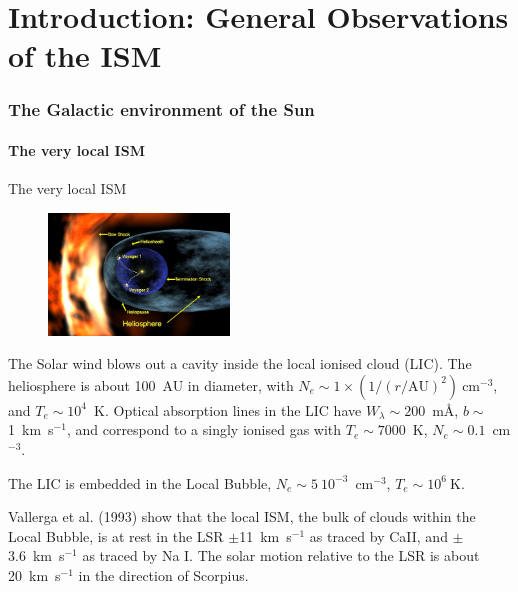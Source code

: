 
\part[I]{Introduction: General Observations of the ISM}
\begin{frame}
  \partpage
  \tableofcontents[part=1]
\end{frame}



\section{The Galactic environment of the Sun}
\subsection{The very local ISM}


\begin{frame}{The very local ISM}

\begin{figure}
    \vspace{-0.5cm}
    \includegraphics[width=0.43\textwidth,height=!]{./A/Voyager_1_entering_heliosheath_region.jpg}
\end{figure}  \vspace{0.1cm} The Solar wind blows out a cavity inside the
local ionised cloud (LIC). The heliosphere is about 100~AU in
diameter, with $N_e \sim 1 \times (1/ (r/\mathrm{AU})^2)~$cm$^{-3}$,
and $T_e \sim 10^4$~K. Optical absorption lines in the LIC have
$W_\lambda \sim 200$~m\AA, $b \sim$1~km~s$^{-1}$, and correspond to a
singly ionised gas with $T_e \sim 7000$~K, $N_e \sim 0.1$~cm$^{-3}$. 

\medskip

The LIC is embedded in the Local Bubble, $N_e \sim 5~10^{-3}$~cm$^{-3}$,
$T_e \sim 10^6~$K.

\medskip

Vallerga et al. (1993) show that the local ISM, the bulk of clouds
within the Local Bubble, is at rest in the LSR $\pm$11~km~s$^{-1}$ as
traced by CaII, and $\pm$3.6~km~s$^{-1}$ as traced by Na I. The solar
motion relative to the LSR is about 20~km~s$^{-1}$ in the direction of
Scorpius. 

\end{frame}

